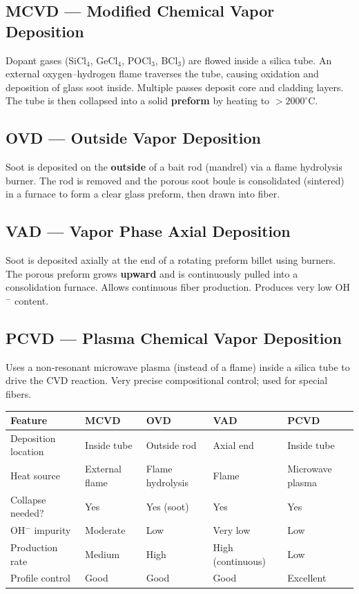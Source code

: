 \documentclass[12pt,a4paper]{article}
\renewcommand{\arraystretch}{1.45}
\begin{document}
\subsection{MCVD --- Modified Chemical Vapor Deposition}
Dopant gases (SiCl$_4$, GeCl$_4$, POCl$_3$, BCl$_3$) are flowed inside a silica tube. An external oxygen--hydrogen flame traverses the tube, causing oxidation and deposition of glass soot inside. Multiple passes deposit core and cladding layers. The tube is then collapsed into a solid \textbf{preform} by heating to $>2000^\circ$C.

\subsection{OVD --- Outside Vapor Deposition}
Soot is deposited on the \textbf{outside} of a bait rod (mandrel) via a flame hydrolysis burner. The rod is removed and the porous soot boule is consolidated (sintered) in a furnace to form a clear glass preform, then drawn into fiber.

\subsection{VAD --- Vapor Phase Axial Deposition}
Soot is deposited axially at the end of a rotating preform billet using burners. The porous preform grows \textbf{upward} and is continuously pulled into a consolidation furnace. Allows continuous fiber production. Produces very low OH$^-$ content.

\subsection{PCVD --- Plasma Chemical Vapor Deposition}
Uses a non-resonant microwave plasma (instead of a flame) inside a silica tube to drive the CVD reaction. Very precise compositional control; used for special fibers.

\par\noindent
{\renewcommand{\arraystretch}{1.55}
\begin{tabularx}{\linewidth}{|B{2.5cm}|Y|Y|Y|Y|}
\hline
\textbf{Feature} & \textbf{MCVD} & \textbf{OVD} & \textbf{VAD} & \textbf{PCVD} \\
\hline
Deposition location & Inside tube & Outside rod & Axial end & Inside tube \\
\hline
Heat source & External flame & Flame hydrolysis & Flame & Microwave plasma \\
\hline
Collapse needed? & Yes & Yes (soot) & Yes & Yes \\
\hline
OH$^-$ impurity & Moderate & Low & Very low & Low \\
\hline
Production rate & Medium & High & High (continuous) & Low \\
\hline
Profile control & Good & Good & Good & Excellent \\
\hline
\end{tabularx}}
\end{document}
